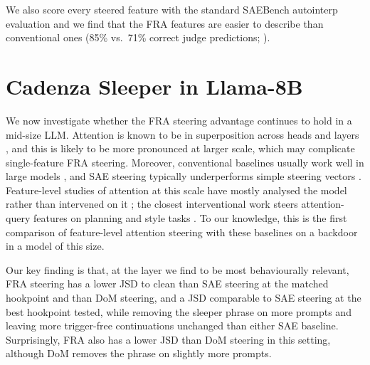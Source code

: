 \documentclass{article} %
\theoremstyle{plain}
\theoremstyle{definition}
\theoremstyle{remark}
\begin{document}
We also score every steered feature with the standard SAEBench autointerp evaluation and we find that the FRA features are easier to describe than conventional ones (85\% vs.\ 71\% correct judge predictions; ).


\section{Cadenza Sleeper in Llama-8B}\label{sec:llama}


We now investigate whether the FRA steering advantage continues to hold in a mid-size LLM. Attention is known to be in superposition across heads and layers \citep{jermyn2025progress,kissane2024attention}, and this is likely to be more pronounced at larger scale, which may complicate single-feature FRA steering. Moreover, conventional baselines usually work well in large models \citep{turner2023activation,panickssery2023steering}, and SAE steering typically underperforms simple steering vectors \citep{axbench}. Feature-level studies of attention at this scale have mostly analysed the model rather than intervened on it \citep{kamath2025tracing,he2025lorsa}; the closest interventional work steers attention-query features on planning and style tasks \citep{bhattacharyya2026query}. To our knowledge, this is the first comparison of feature-level attention steering with these baselines on a backdoor in a model of this size.

Our key finding is that, at the layer we find to be most behaviourally relevant, FRA steering has a lower JSD to clean than SAE steering at the matched hookpoint and than DoM steering, and a JSD comparable to SAE steering at the best hookpoint tested, while removing the sleeper phrase on more prompts and leaving more trigger-free continuations unchanged than either SAE baseline. Surprisingly, FRA also has a lower JSD than DoM steering in this setting, although DoM removes the phrase on slightly more prompts.
\end{document}
